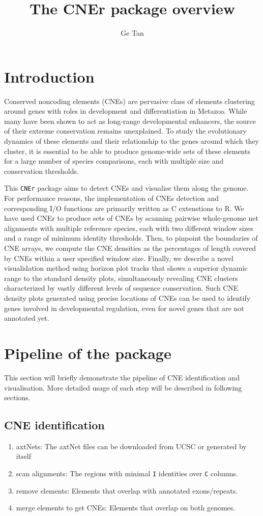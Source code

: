 \documentclass{article}
\title{The \textbf{CNEr} package overview}
\author{Ge Tan}
\newcommand{\Rcode}[1]{{\texttt{#1}}}
\begin{document}

\maketitle

\tableofcontents

\section{Introduction}
Conserved noncoding elements (CNEs) are pervasive class of elements 
clustering around genes with roles in development and differentiation in Metazoa. 
While many have been shown to act as long-range developmental enhancers, 
the source of their extreme conservation remains unexplained. 
To study the evolutionary dynamics of these elements 
and their relationship to the genes around which they cluster, 
it is essential to be able to produce genome-wide sets of these elements 
for a large number of species comparisons, 
each with multiple size and conservation thresholds.

This \Rcode{CNEr} package aims to detect CNEs and visualise them along the genome.
For performance reasons, the implementation of CNEs detection 
and corresponding I/O functions are primarily written as C extenstions to R. 
We have used CNEr to produce sets of CNEs by scanning pairwise whole-genome net alignments with multiple reference species, 
each with two different window sizes and a range of minimum identity thresholds. 
Then, to pinpoint the boundaries of CNE arrays, 
we compute the CNE densities as the percentages of length 
covered by CNEs within a user specified window size. 
Finally, we describe a novel visualidation method using horizon plot tracks 
that shows a superior dynamic range to the standard density plots, 
simultaneously revealing CNE clusters characterized 
by vastly different levels of sequence conservation. 
Such CNE density plots generated using precise locations of CNEs 
can be used to identify genes involved in developmental regulation, 
even for novel genes that are not annotated yet.

\section{Pipeline of the package}
This section will briefly demonstrate the pipeline of CNE identification and visualisation.
More detailed usage of each step will be described in following sections.
\subsection{CNE identification}
\begin{enumerate}
  \item axtNets: The axtNet files can be downloaded from UCSC or generated by itself
  \item scan alignments: The regions with minimal \Rcode{I} identities over \Rcode{C} columns.
  \item remove elements: Elements that overlap with annotated exons/repeats.
  \item merge elements to get CNEs: Elements that overlap on both genomes.
\end{enumerate}
\end{document}
